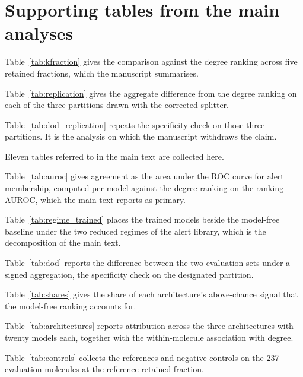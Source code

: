 \documentclass[journal=jcisd8,manuscript=suppinfo]{achemso}
\begin{document}
\section{Supporting tables from the main analyses}

Table~\ref{tab:kfraction} gives the comparison against the degree ranking across five
retained fractions, which the manuscript summarises.



Table~\ref{tab:replication} gives the aggregate difference from the degree ranking on each of
the three partitions drawn with the corrected splitter.



Table~\ref{tab:dod_replication} repeats the specificity check on those three partitions. It is
the analysis on which the manuscript withdraws the claim.




Eleven tables referred to in the main text are collected here.

Table~\ref{tab:auroc} gives agreement as the area under the ROC curve for alert membership,
computed per model against the degree ranking on the ranking AUROC, which the main text
reports as primary.



Table~\ref{tab:regime_trained} places the trained models beside the model-free baseline under
the two reduced regimes of the alert library, which is the decomposition of the main text.



Table~\ref{tab:dod} reports the difference between the two evaluation sets under a signed
aggregation, the specificity check on the designated partition.



Table~\ref{tab:shares} gives the share of each architecture's above-chance signal that the
model-free ranking accounts for.



Table~\ref{tab:architectures} reports attribution across the three architectures with twenty
models each, together with the within-molecule association with degree.



Table~\ref{tab:controls} collects the references and negative controls on the 237 evaluation
molecules at the reference retained fraction.
\end{document}

